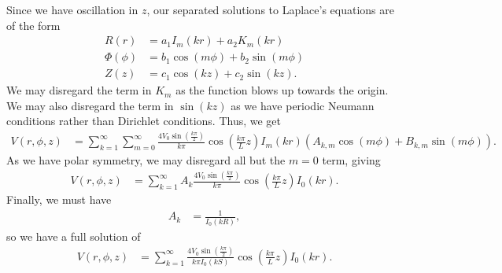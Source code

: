 \documentclass[10pt]{mypackage}
\begin{document}
\begin{solution}[41.16]
  Since we have oscillation in $z$, our separated solutions to Laplace's equations are of the form
  \begin{align*}
    R(r) &= a_1I_{m}\left( kr \right) + a_2K_{m}\left( kr \right)\\
    \Phi(\phi) &= b_1\cos\left( m\phi \right) + b_2\sin\left( m\phi \right)\\
    Z(z) &= c_1\cos\left( kz \right) + c_2\sin\left( kz \right).
  \end{align*}
  We may disregard the term in $K_m$ as the function blows up towards the origin. We may also disregard the term in $\sin(kz)$ as we have periodic Neumann conditions rather than Dirichlet conditions. Thus, we get
  \begin{align*}
    V(r,\phi,z) &= \sum_{k=1}^{\infty}\sum_{m=0}^{\infty} \frac{4V_0\sin\left( \frac{k\pi}{2} \right)}{k\pi}\cos\left( \frac{k\pi}{L}z \right) I_{m}\left( kr \right)\left( A_{k,m}\cos\left( m\phi \right) + B_{k,m}\sin\left( m\phi \right) \right).
  \end{align*}
  As we have polar symmetry, we may disregard all but the $m=0$ term, giving
  \begin{align*}
    V\left( r,\phi,z \right) &= \sum_{k=1}^{\infty}A_{k}\frac{4V_0\sin\left( \frac{k\pi}{2} \right)}{k\pi}\cos\left( \frac{k\pi}{L}z \right)I_0\left( kr \right).
  \end{align*}
  Finally, we must have
  \begin{align*}
    A_k &= \frac{1}{I_0\left( kR \right)},
  \end{align*}
  so we have a full solution of
  \begin{align*}
    V\left( r,\phi,z \right) &= \sum_{k=1}^{\infty}\frac{4V_0\sin\left( \frac{k\pi}{2} \right)}{k\pi I_0\left( kS \right)} \cos\left( \frac{k\pi}{L}z \right)I_0\left( kr \right).
  \end{align*}
\end{solution}
\end{document}
